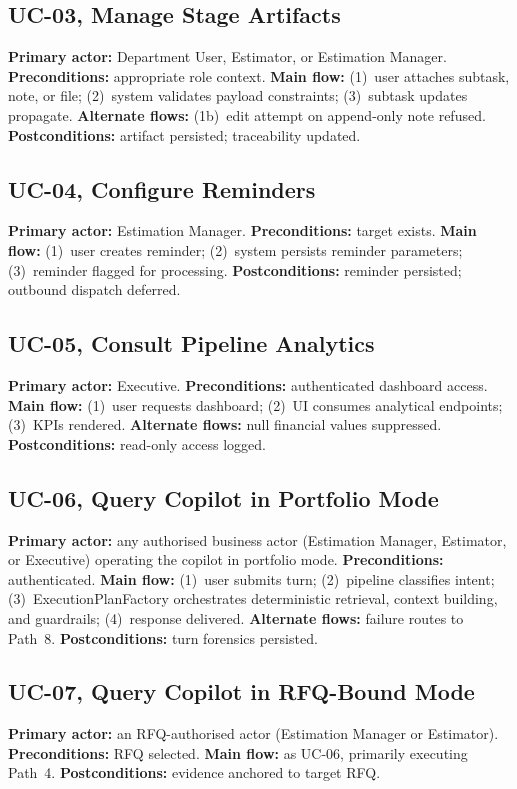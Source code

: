 \subsection{UC-03, Manage Stage Artifacts}
\textbf{Primary actor:} Department User, Estimator, or Estimation Manager. \textbf{Preconditions:} appropriate role context. \textbf{Main flow:} (1)~user attaches subtask, note, or file; (2)~system validates payload constraints; (3)~subtask updates propagate. \textbf{Alternate flows:} (1b)~edit attempt on append-only note refused. \textbf{Postconditions:} artifact persisted; traceability updated.

\subsection{UC-04, Configure Reminders}
\textbf{Primary actor:} Estimation Manager. \textbf{Preconditions:} target exists. \textbf{Main flow:} (1)~user creates reminder; (2)~system persists reminder parameters; (3)~reminder flagged for processing. \textbf{Postconditions:} reminder persisted; outbound dispatch deferred.

\subsection{UC-05, Consult Pipeline Analytics}
\textbf{Primary actor:} Executive. \textbf{Preconditions:} authenticated dashboard access. \textbf{Main flow:} (1)~user requests dashboard; (2)~UI consumes analytical endpoints; (3)~KPIs rendered. \textbf{Alternate flows:} null financial values suppressed. \textbf{Postconditions:} read-only access logged.

\subsection{UC-06, Query Copilot in Portfolio Mode}
\textbf{Primary actor:} any authorised business actor (Estimation Manager, Estimator, or Executive) operating the copilot in portfolio mode. \textbf{Preconditions:} authenticated. \textbf{Main flow:} (1)~user submits turn; (2)~pipeline classifies intent; (3)~ExecutionPlanFactory orchestrates deterministic retrieval, context building, and guardrails; (4)~response delivered. \textbf{Alternate flows:} failure routes to Path~8. \textbf{Postconditions:} turn forensics persisted.

\subsection{UC-07, Query Copilot in RFQ-Bound Mode}
\textbf{Primary actor:} an RFQ-authorised actor (Estimation Manager or Estimator). \textbf{Preconditions:} RFQ selected. \textbf{Main flow:} as UC-06, primarily executing Path~4. \textbf{Postconditions:} evidence anchored to target RFQ.

